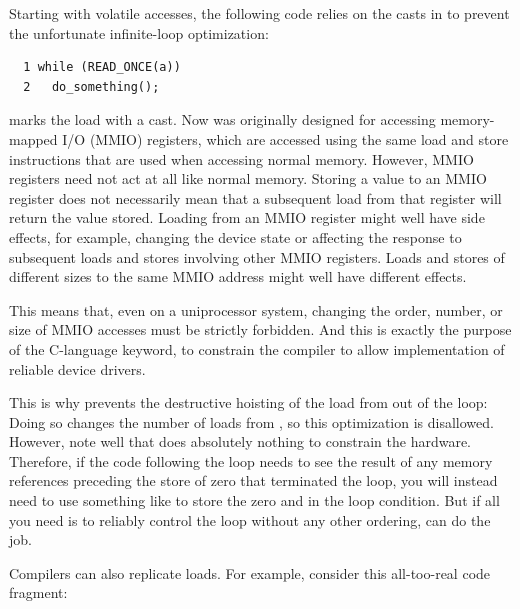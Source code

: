Starting with volatile accesses, the following code
relies on the  casts in  to prevent
the unfortunate infinite-loop optimization:

\vspace{5pt}
\begin{minipage}[t]{\columnwidth}
\scriptsize
\begin{verbatim}
  1 while (READ_ONCE(a))
  2   do_something();
\end{verbatim}
\end{minipage}
\vspace{5pt}

 marks the load with a  cast.
Now  was originally designed for accessing
memory-mapped I/O (MMIO) registers, which are accessed using
the same load and store instructions that are used when
accessing normal memory.
However, MMIO registers need not act at all like normal memory.
Storing a value to an MMIO register does not necessarily mean
that a subsequent load from that register will return the value
stored.
Loading from an MMIO register might well have side effects,
for example, changing the device state or affecting the response
to subsequent loads and stores involving other MMIO registers.
Loads and stores of different sizes to the same MMIO address
might well have different effects.

This means that, even on a uniprocessor system, changing the
order, number, or size of MMIO accesses must be strictly
forbidden.
And this is exactly the purpose of the C-language  keyword,
to constrain the compiler to allow implementation of reliable device
drivers.

This is why  prevents the destructive hoisting of
the load from  out of the loop:  Doing so changes the number
of  loads from , so this optimization is disallowed.
However, note well that  does absolutely nothing to
constrain the hardware.
Therefore, if the code following the loop needs to see the result of
any memory references preceding the store of zero that terminated
the loop, you will instead need to use something like
 to store the zero and 
in the loop condition.
But if all you need is to reliably control the loop without any
other ordering,  can do the job.

Compilers can also replicate loads.
For example, consider this all-too-real code fragment:

